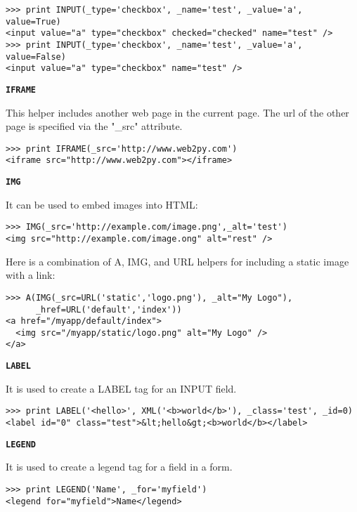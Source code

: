 \documentclass[justified,sixbynine,notoc]{tufte-book}
\def\ft{\small\tt}
\def\inxx#1{\index{#1}}
\begin{document}
\begin{fullwidth}
\inxx{checkbox}
\begin{lstlisting}
>>> print INPUT(_type='checkbox', _name='test', _value='a', value=True)
<input value="a" type="checkbox" checked="checked" name="test" />
>>> print INPUT(_type='checkbox', _name='test', _value='a', value=False)
<input value="a" type="checkbox" name="test" />
\end{lstlisting}

{\bf {\ft IFRAME}}

This helper includes another web page in the current page. The url of the other page is specified via the "\_src" attribute.

\inxx{IFRAME}
\begin{lstlisting}
>>> print IFRAME(_src='http://www.web2py.com')
<iframe src="http://www.web2py.com"></iframe>
\end{lstlisting}

{\bf {\ft IMG}}

\inxx{IMG}

It can be used to embed images into HTML:

\begin{lstlisting}
>>> IMG(_src='http://example.com/image.png',_alt='test')
<img src="http://example.com/image.ong" alt="rest" />
\end{lstlisting}

Here is a combination of A, IMG, and URL helpers for including a static image with a link:

\begin{lstlisting}
>>> A(IMG(_src=URL('static','logo.png'), _alt="My Logo"),
      _href=URL('default','index'))
<a href="/myapp/default/index">
  <img src="/myapp/static/logo.png" alt="My Logo" />
</a>
\end{lstlisting}

{\bf {\ft LABEL}}

It is used to create a LABEL tag for an INPUT field.

\inxx{LABEL}
\begin{lstlisting}
>>> print LABEL('<hello>', XML('<b>world</b>'), _class='test', _id=0)
<label id="0" class="test">&lt;hello&gt;<b>world</b></label>
\end{lstlisting}

{\bf {\ft LEGEND}}

It is used to create a legend tag for a field in a form.

\inxx{LEGEND}
\begin{lstlisting}
>>> print LEGEND('Name', _for='myfield')
<legend for="myfield">Name</legend>
\end{lstlisting}


\end{fullwidth}
\end{document}
